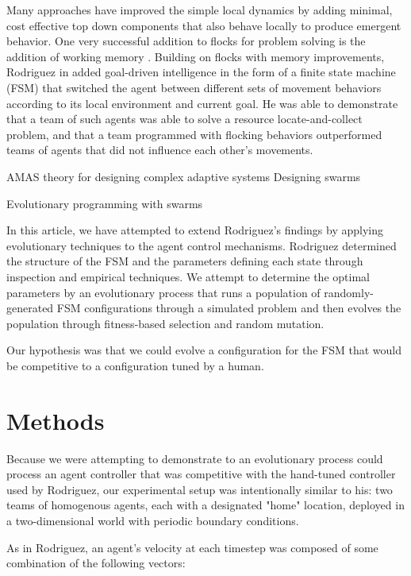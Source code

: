 \documentclass[12pt,journal,compsoc]{IEEEtran}
\begin{document}
Many approaches have improved the simple local dynamics by adding minimal, cost effective top down components that also behave locally to produce emergent behavior. One very successful addition to flocks for problem solving is the addition of working memory \cite{winder2012role,hu2003particle}. Building on flocks with memory improvements, Rodriguez in \cite{rodriguez2004extending} added goal-driven intelligence in the form of a finite state machine (FSM) that switched the agent between different sets of movement behaviors according to its local environment and current goal. He was able to demonstrate that a team of such agents was able to solve a resource locate-and-collect problem, and that a team programmed with flocking behaviors outperformed teams of agents that did not influence each other's movements.



AMAS theory for designing complex adaptive systems \cite{capera2003amas}
Designing swarms \cite{mataric1993designing}

Evolutionary programming with swarms \cite{wei2002swarm,miranda2005evolutionary}

In this article, we have attempted to extend Rodriguez's findings by applying evolutionary techniques to the agent control mechanisms. Rodriguez determined the structure of the FSM and the parameters defining each state through inspection and empirical techniques. We attempt to determine the optimal parameters by an evolutionary process that runs a population of randomly-generated FSM configurations through a simulated problem and then evolves the population through fitness-based selection and random mutation.

Our hypothesis was that we could evolve a configuration for the FSM that would be competitive to a configuration tuned by a human.

\section{Methods}

Because we were attempting to demonstrate to an evolutionary process could process an agent controller that was  competitive with the hand-tuned controller used by Rodriguez, our experimental setup was intentionally similar to his: two teams of homogenous agents, each with a designated "home" location, deployed in a two-dimensional world with periodic boundary conditions.

As in Rodriguez, an agent's velocity at each timestep was composed of some combination of the following vectors:
\end{document}
